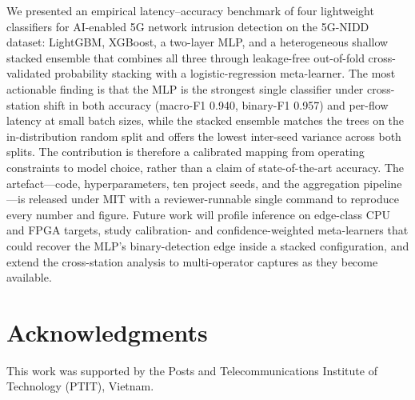 \documentclass[conference]{IEEEtran}
\begin{document}
We presented an empirical latency--accuracy benchmark of four
lightweight classifiers for AI-enabled 5G network intrusion detection
on the 5G-NIDD dataset: LightGBM, XGBoost, a two-layer MLP, and a
heterogeneous shallow stacked ensemble that combines all three through
leakage-free out-of-fold cross-validated probability stacking with a
logistic-regression meta-learner. The most actionable finding is that
the MLP is the strongest single classifier under cross-station shift in
both accuracy (macro-F1 0.940, binary-F1 0.957) and per-flow latency at
small batch sizes, while the stacked ensemble matches the trees on the
in-distribution random split and offers the lowest inter-seed variance
across both splits. The contribution is therefore a calibrated mapping
from operating constraints to model choice, rather than a claim of
state-of-the-art accuracy. The artefact---code, hyperparameters, ten
project seeds, and the aggregation pipeline---is released under MIT
with a reviewer-runnable single command to reproduce every number and
figure. Future work will profile inference on edge-class CPU and FPGA
targets, study calibration- and confidence-weighted meta-learners that
could recover the MLP's binary-detection edge inside a stacked
configuration, and extend the cross-station analysis to multi-operator
captures as they become available.

\section*{Acknowledgments}
This work was supported by the Posts and Telecommunications Institute
of Technology (PTIT), Vietnam.



\end{document}
